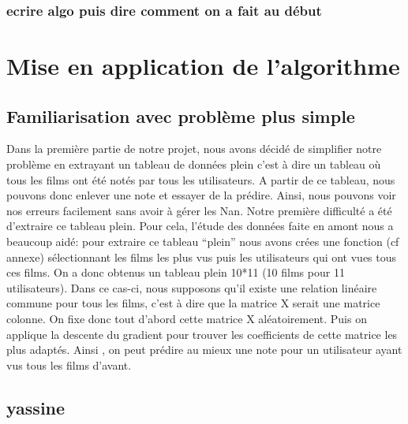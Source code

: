 \documentclass[a4paper,10pt]{article}
\begin{document}
\subsubsection{ecrire algo puis dire comment on a fait au début}
\section{Mise en application de l'algorithme}
\subsection{Familiarisation avec problème plus simple}
Dans la première partie de notre projet, nous avons décidé de simplifier notre problème en extrayant un tableau de données 
plein c'est à dire un tableau où tous les films ont été notés par tous les utilisateurs. 
A partir de ce tableau, nous pouvons donc enlever une note et essayer de la prédire. Ainsi, nous pouvons voir nos erreurs facilement sans avoir à gérer les Nan.
Notre première difficulté a été d'extraire ce tableau plein. Pour cela, l'étude des données faite en amont nous a beaucoup aidé: pour extraire ce tableau ``plein''
nous avons crées une fonction (cf annexe) sélectionnant les films les plus vus puis les utilisateurs qui ont vues tous ces films. On a donc obtenus un
tableau plein 10*11 (10 films pour 11 utilisateurs).
Dans ce cas-ci, nous supposons qu'il existe une relation linéaire commune pour tous les films, c'est à dire que la matrice X serait une matrice colonne.
On fixe donc tout d'abord cette matrice X aléatoirement. Puis on applique la descente du gradient pour trouver les coefficients de cette matrice les plus adaptés.
Ainsi , on peut prédire au mieux une note pour un utilisateur ayant vus tous les films d'avant.
\subsection{yassine}
\end{document}
